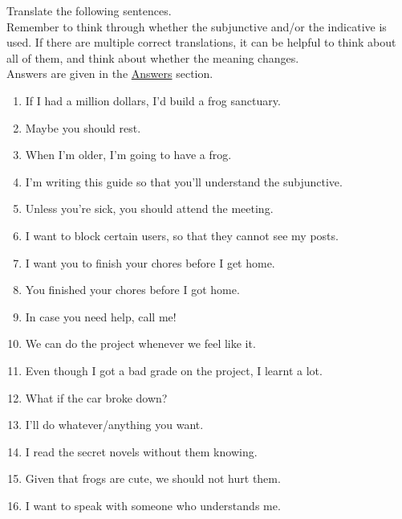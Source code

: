 Translate the following sentences.\\

Remember to think through whether the subjunctive and/or the indicative is used. If there are multiple correct translations, it can be helpful to think about all of them, and think about whether the meaning changes. \\

Answers are given in the \hyperref[sec:ans]{Answers} section.

\begin{enumerate}
	\item If I had a million dollars, I'd build a frog sanctuary. 
	\item Maybe you should rest.
	\item When I'm older, I'm going to have a frog.
	\item I'm writing this guide so that you'll understand the subjunctive. 
	\item Unless you're sick, you should attend the meeting.
	\item I want to block certain users, so that they cannot see my posts.
	\item I want you to finish your chores before I get home. 
	\item You finished your chores before I got home.
	\item In case you need help, call me!
	\item We can do the project whenever we feel like it. 
	\item Even though I got a bad grade on the project, I learnt a lot.
	\item What if the car broke down?
	\item I'll do whatever/anything you want.
	\item I read the secret novels without them knowing. 
	\item Given that frogs are cute, we should not hurt them.
	\item I want to speak with someone who understands me.
\end{enumerate}
